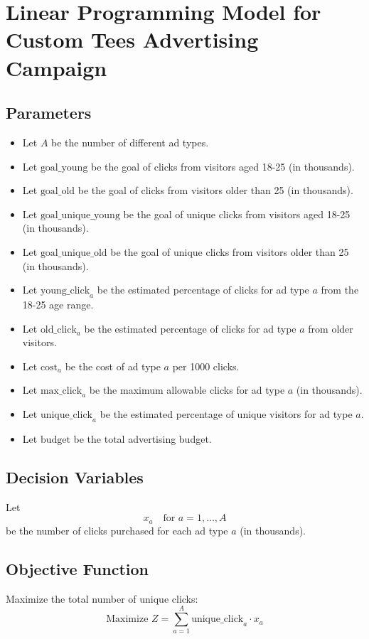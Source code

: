 \documentclass{article}
\begin{document}
\section*{Linear Programming Model for Custom Tees Advertising Campaign}

\subsection*{Parameters}
\begin{itemize}
    \item Let \( A \) be the number of different ad types.
    \item Let \( \text{goal\_young} \) be the goal of clicks from visitors aged 18-25 (in thousands).
    \item Let \( \text{goal\_old} \) be the goal of clicks from visitors older than 25 (in thousands).
    \item Let \( \text{goal\_unique\_young} \) be the goal of unique clicks from visitors aged 18-25 (in thousands).
    \item Let \( \text{goal\_unique\_old} \) be the goal of unique clicks from visitors older than 25 (in thousands).
    \item Let \( \text{young\_click}_{a} \) be the estimated percentage of clicks for ad type \( a \) from the 18-25 age range.
    \item Let \( \text{old\_click}_{a} \) be the estimated percentage of clicks for ad type \( a \) from older visitors.
    \item Let \( \text{cost}_{a} \) be the cost of ad type \( a \) per 1000 clicks.
    \item Let \( \text{max\_click}_{a} \) be the maximum allowable clicks for ad type \( a \) (in thousands).
    \item Let \( \text{unique\_click}_{a} \) be the estimated percentage of unique visitors for ad type \( a \).
    \item Let \( \text{budget} \) be the total advertising budget.
\end{itemize}

\subsection*{Decision Variables}
Let 
\[
x_a \quad \text{for } a = 1, \ldots, A
\]
be the number of clicks purchased for each ad type \( a \) (in thousands).

\subsection*{Objective Function}
Maximize the total number of unique clicks:
\[
\text{Maximize } Z = \sum_{a=1}^{A} \text{unique\_click}_{a} \cdot x_a
\]
\end{document}
